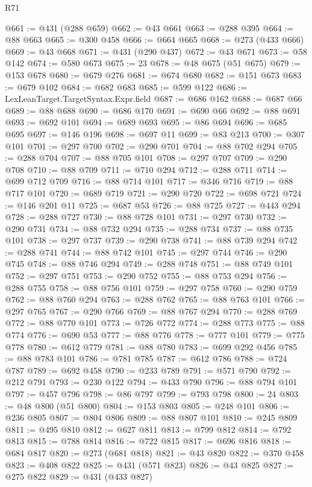 \begin{lexlean}{R71}
\begin{coremodule}
@661 := @431 (@288 @659)
@662 := @43 @661
@663 := @288 @395
@664 := @88 @663
@665 := @300 @458
@666 := @664 @665
@668 := @273 (@433 @666)
@669 := @43 @668
@671 := @431 (@290 @437)
@672 := @43 @671
@673 := @58 @142
@674 := @580 @673
@675 := 23
@678 := @48 @675 (@51 @675)
@679 := @153 @678
@680 := @679 @276
@681 := @674 @680
@682 := @151 @673
@683 := @679 @102
@684 := @682 @683
@685 := @599 @122
@686 := LexLeanTarget.TargetSyntax.Expr.field
@687 := @686 @162
@688 := @687 @66
@689 := @88 @688
@690 := @686 @170
@691 := @690 @66
@692 := @88 @691
@693 := @692 @101
@694 := @689 @693
@695 := @86 @694
@696 := @685 @695
@697 := @146 @196
@698 := @697 @11
@699 := @83 @213
@700 := @307 @101
@701 := @297 @700
@702 := @290 @701
@704 := @88 @702 @294
@705 := @288 @704
@707 := @88 @705 @101
@708 := @297 @707
@709 := @290 @708
@710 := @88 @709
@711 := @710 @294
@712 := @288 @711
@714 := @699 @712 @709
@716 := @88 @714 @101
@717 := @346 @716
@719 := @88 @717 @101
@720 := @689 @719
@721 := @290 @720
@722 := @698 @721
@724 := @146 @201 @11
@725 := @687 @53
@726 := @88 @725
@727 := @443 @294
@728 := @288 @727
@730 := @88 @728 @101
@731 := @297 @730
@732 := @290 @731
@734 := @88 @732 @294
@735 := @288 @734
@737 := @88 @735 @101
@738 := @297 @737
@739 := @290 @738
@741 := @88 @739 @294
@742 := @288 @741
@744 := @88 @742 @101
@745 := @297 @744
@746 := @290 @745
@748 := @88 @746 @294
@749 := @288 @748
@751 := @88 @749 @101
@752 := @297 @751
@753 := @290 @752
@755 := @88 @753 @294
@756 := @288 @755
@758 := @88 @756 @101
@759 := @297 @758
@760 := @290 @759
@762 := @88 @760 @294
@763 := @288 @762
@765 := @88 @763 @101
@766 := @297 @765
@767 := @290 @766
@769 := @88 @767 @294
@770 := @288 @769
@772 := @88 @770 @101
@773 := @726 @772
@774 := @288 @773
@775 := @88 @774
@776 := @690 @53
@777 := @88 @776
@778 := @777 @101
@779 := @775 @778
@780 := @612 @779
@781 := @88 @780
@783 := @699 @292 @456
@785 := @88 @783 @101
@786 := @781 @785
@787 := @612 @786
@788 := @724 @787
@789 := @692 @458
@790 := @233 @789
@791 := @571 @790
@792 := @212 @791
@793 := @230 @122
@794 := @433 @790
@796 := @88 @794 @101
@797 := @457 @796
@798 := @86 @797
@799 := @793 @798
@800 := 24
@803 := @48 @800 (@51 @800)
@804 := @153 @803
@805 := @248 @101
@806 := @236 @805
@807 := @804 @806
@809 := @88 @807 @101
@810 := @245 @809
@811 := @495 @810
@812 := @627 @811
@813 := @799 @812
@814 := @792 @813
@815 := @788 @814
@816 := @722 @815
@817 := @696 @816
@818 := @684 @817
@820 := @273 (@681 @818)
@821 := @43 @820
@822 := @370 @458
@823 := @408 @822
@825 := @431 (@571 @823)
@826 := @43 @825
@827 := @275 @822
@829 := @431 (@433 @827)

\end{coremodule}
\end{lexlean}
